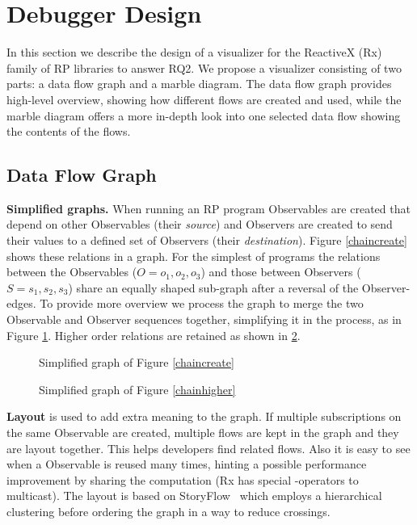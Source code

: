 \section{Debugger Design}
In this section we describe the design of a visualizer for the ReactiveX (Rx) family of RP libraries to answer RQ2. We propose a visualizer consisting of two parts: a data flow graph and a marble diagram. The data flow graph provides high-level overview, showing how different flows are created and used, while the marble diagram offers a more in-depth look into one selected data flow showing the contents of the flows.

\subsection{Data Flow Graph}
\textbf{Simplified graphs.} When running an RP program Observables are created that depend on other Observables (their \textit{source}) and Observers are created to send their values to a defined set of Observers (their \textit{destination}). Figure \ref{chaincreate} shows these relations in a graph. For the simplest of programs the relations between the Observables ($O = {o_1, o_2, o_3}$) and those between Observers ($S = {s_1, s_2, s_3}$) share an equally shaped sub-graph after a reversal of the Observer-edges. To provide more overview we process the graph to merge the two Observable and Observer sequences together, simplifying it in the process, as in Figure \ref{fiddlesimple}. Higher order relations are retained as shown in \ref{fiddlehigher}.

\begin{figure}[ht]
	\centering
	
	\caption{Simplified graph of Figure \ref{chaincreate}}
	\label{fiddlesimple}
\end{figure}

\begin{figure}[ht]
	\centering
	
	\caption{Simplified graph of Figure \ref{chainhigher}}
	\label{fiddlehigher}
\end{figure}

\textbf{Layout} is used to add extra meaning to the graph. If multiple subscriptions on the same Observable are created, multiple flows are kept in the graph and they are layout together. This helps developers find related flows. Also it is easy to see when a Observable is reused many times, hinting a possible performance improvement by sharing the computation (Rx has special -operators to multicast). The layout is based on StoryFlow~\cite{liu2013storyflow} which employs a hierarchical clustering before ordering the graph in a way to reduce crossings.

